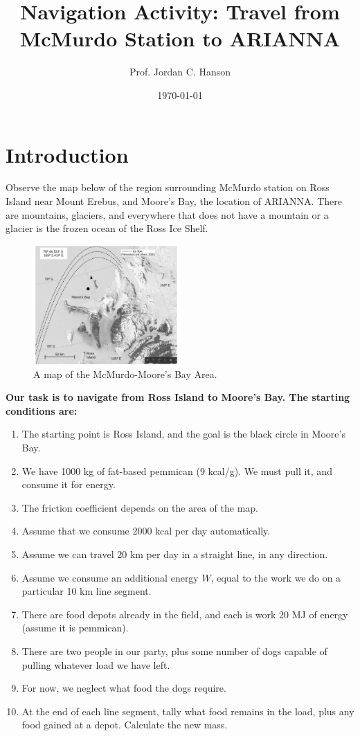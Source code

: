 \documentclass{article}
\begin{document}
\title{Navigation Activity: Travel from McMurdo Station to ARIANNA}
\date{\today}
\author{Prof. Jordan C. Hanson}

\maketitle

\section{Introduction}

Observe the map below of the region surrounding McMurdo station on Ross Island near Mount Erebus, and Moore's Bay, the location of ARIANNA.  There are mountains, glaciers, and everywhere that does not have a mountain or a glacier is the frozen ocean of the Ross Ice Shelf.

\begin{figure}[ht]
\centering
\includegraphics[width=0.5\textwidth]{NavigationMazePlain.pdf}
\caption{\label{fig:maze1} A map of the McMurdo-Moore's Bay Area.}
\end{figure}

\textbf{Our task is to navigate from Ross Island to Moore's Bay.  The starting conditions are:}
\begin{enumerate}
\item The starting point is Ross Island, and the goal is the black circle in Moore's Bay.
\item We have 1000 kg of fat-based pemmican (9 kcal/g).  We must pull it, and consume it for energy.
\item The friction coefficient depends on the area of the map.
\item Assume that we consume 2000 kcal per day automatically.
\item Assume we can travel 20 km per day in a straight line, in any direction.
\item Assume we consume an additional energy $W$, equal to the work we do on a particular 10 km line segment.
\item There are food depots already in the field, and each is work 20 MJ of energy (assume it is pemmican).
\item There are two people in our party, plus some number of dogs capable of pulling whatever load we have left.
\item For now, we neglect what food the dogs require.
\item At the end of each line segment, tally what food remains in the load, plus any food gained at a depot.  Calculate the new mass.
\end{enumerate}
\end{document}
